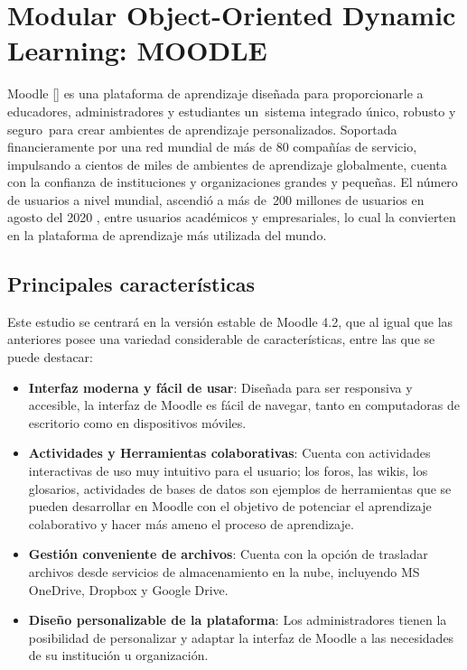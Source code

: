 \section{Modular Object-Oriented Dynamic Learning: MOODLE}
Moodle [\cite{Moodle_Solutions}] es una plataforma de aprendizaje diseñada para proporcionarle a educadores, administradores y estudiantes un sistema integrado único, robusto y seguro para crear ambientes de aprendizaje personalizados. Soportada financieramente por una red mundial de más de 80 compañías de servicio, impulsando a cientos de miles de ambientes de aprendizaje globalmente, cuenta con la confianza de instituciones y organizaciones grandes y pequeñas. El número de usuarios a nivel mundial, ascendió a más de 200 millones de usuarios en agosto del 2020 \cite{Moodle_stats}, entre usuarios académicos y empresariales, lo cual la convierten en la plataforma de aprendizaje más utilizada del mundo.

\subsection{Principales características}
Este estudio se centrará en la versión estable de Moodle 4.2, que al igual que las anteriores posee una variedad considerable de características, entre las que se puede destacar:  
\begin{itemize}
    \item \textbf{Interfaz moderna y fácil de usar}: Diseñada para ser responsiva y accesible, la interfaz de Moodle es fácil de navegar, tanto en computadoras de escritorio como en dispositivos móviles.
    \item \textbf{Actividades y Herramientas colaborativas}: Cuenta con actividades interactivas de uso muy intuitivo para el usuario; los foros, las wikis, los glosarios, actividades de bases de datos son ejemplos de herramientas que se pueden desarrollar en Moodle con el objetivo de potenciar el aprendizaje colaborativo y hacer más ameno el proceso de aprendizaje.
    \item \textbf{Gestión conveniente de archivos}: Cuenta con la opción de trasladar archivos desde servicios de almacenamiento en la nube, incluyendo MS OneDrive, Dropbox y Google Drive.
    \item \textbf{Diseño personalizable de la plataforma}: Los administradores tienen la posibilidad de personalizar y adaptar la interfaz de Moodle a las necesidades de su institución u organización. 
\end{itemize}

